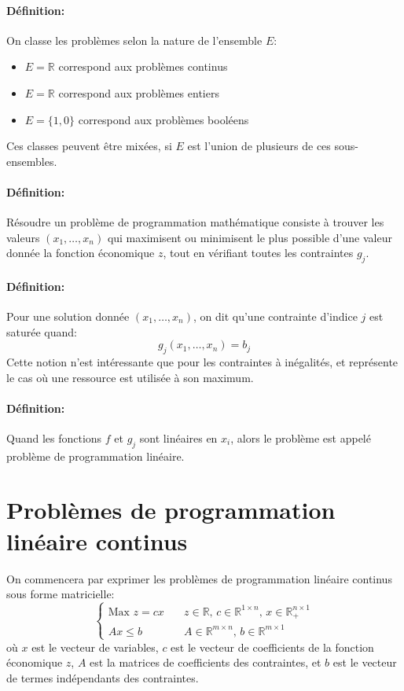 \documentclass[a4paper]{report}
\begin{document}
\paragraph{Définition:}On classe les problèmes selon la nature de l'ensemble \(E\):
\begin{itemize}
	\item \(E=\mathbb{R}\) correspond aux problèmes continus
	\item \(E=\mathbb{R}\) correspond aux problèmes entiers
	\item \(E=\{1,0\}\) correspond aux problèmes booléens
\end{itemize}
Ces classes peuvent être mixées, si \(E\) est l'union de plusieurs de ces sous-ensembles.

\paragraph{Définition:}
Résoudre un problème de programmation mathématique consiste à trouver les
valeurs \((x_1,\dots,x_n)\) qui maximisent ou minimisent le plus
possible d'une valeur donnée la fonction économique \(z\),
tout en vérifiant toutes les contraintes \(g_j\).

\paragraph{Définition:}
Pour une solution donnée \((x_1,\dots,x_n)\), on dit qu'une contrainte
d'indice \(j\) est saturée quand:
\[g_j(x_1,\dots,x_n)=b_j\]
Cette notion n'est intéressante que pour les contraintes à inégalités, et représente le cas où une ressource est utilisée à son maximum.

\paragraph{Définition:}
Quand les fonctions \(f\) et \(g_j\) sont linéaires en \(x_i\), alors le
problème est appelé problème de programmation linéaire.

\section{Problèmes  de programmation linéaire continus}
On commencera par exprimer les problèmes de programmation linéaire continus sous forme matricielle:
\[\begin{cases}
\text{Max } z=cx \quad & z\in\mathbb{R},\,c\in\mathbb{R}^{1\times n},\,
x\in\mathbb{R}^{n\times 1}_+ \\
Ax \le b               & A\in\mathbb{R}^{m\times n},\,
b\in\mathbb{R}^{m\times 1}
\end{cases}\]
où \(x\) est le vecteur de variables, \(c\) est le vecteur de coefficients de
la fonction économique \(z\), \(A\) est la matrices de coefficients des contraintes, et \(b\) est le vecteur de termes indépendants des contraintes.
\end{document}
